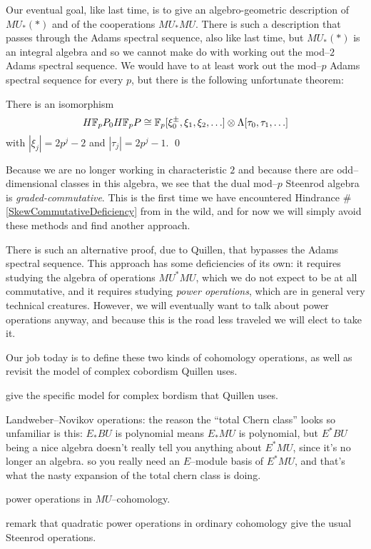 Our eventual goal, like last time, is to give an algebro-geometric description of $MU_*(*)$ and of the cooperations $MU_* MU$.  There is such a description that passes through the Adams spectral sequence, also like last time, but $MU_*(*)$ is an integral algebra and so we cannot make do with working out the mod--$2$ Adams spectral sequence.  We would have to at least work out the mod--$p$ Adams spectral sequence for every $p$, but there is the following unfortunate theorem:
\begin{theorem}
There is an isomorphism
\[H\mathbb F_pP_0 H\mathbb F_pP \cong \mathbb F_p[\xi_0^\pm, \xi_1, \xi_2, \ldots] \otimes \Lambda[\tau_0, \tau_1, \ldots]\]
with $|\xi_j| = 2p^j-2$ and $|\tau_j| = 2p^j - 1$. \qed
\end{theorem}
\noindent Because we are no longer working in characteristic $2$ and because there are odd--dimensional classes in this algebra, we see that the dual mod--$p$ Steenrod algebra is \emph{graded-commutative}.  This is the first time we have encountered Hindrance \#\ref{SkewCommutativeDeficiency} from  in the wild, and for now we will simply avoid these methods and find another approach.

There is such an alternative proof, due to Quillen, that bypasses the Adams spectral sequence.  This approach has some deficiencies of its own: it requires studying the algebra of operations $MU^* MU$, which we do not expect to be at all commutative, and it requires studying \textit{power operations}, which are in general very technical creatures.  However, we will eventually want to talk about power operations anyway, and because this is the road less traveled we will elect to take it.

Our job today is to define these two kinds of cohomology operations, as well as revisit the model of complex cobordism Quillen uses.



give the specific model for complex bordism that Quillen uses.

Landweber--Novikov operations: the reason the ``total Chern class'' looks so unfamiliar is this: $E_* BU$ is polynomial means $E_* MU$ is polynomial, but $E^* BU$ being a nice algebra doesn't really tell you anything about $E^* MU$, since it's no longer an algebra.  so you really need an $E$--module basis of $E^* MU$, and that's what the nasty expansion of the total chern class is doing.

power operations in $MU$--cohomology.

remark that quadratic power operations in ordinary cohomology give the usual Steenrod operations.


